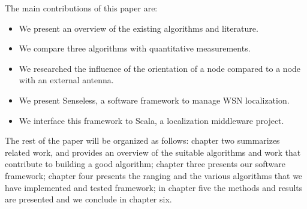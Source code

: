 The main contributions of this paper are: 
\begin{itemize}
	\item We present an overview of the existing algorithms and literature. 
	\item We compare three algorithms with quantitative measurements. 
	\item We researched the influence of the orientation of a node compared to a node with an external antenna.
	\item We present Senseless, a software framework to manage WSN localization.
	\item We interface this framework to Scala, a localization middleware project. 
\end{itemize}

The rest of the paper will be organized as follows: chapter two summarizes related work, and provides an overview of the suitable algorithms and work that contribute to building a good algorithm; chapter three presents our software framework; chapter four presents the ranging and the various algorithms that we have implemented and tested framework; in chapter five the methods and results are presented and we conclude in chapter six. 